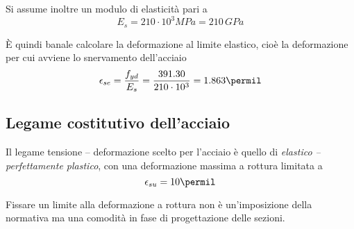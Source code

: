 Si assume inoltre un modulo di elasticit\`a pari a 
\begin{equation}
    \label{eq:Es}
	E_s = 210\cdot 10^3 MPa = 210\,GPa
\end{equation}

\`E quindi banale calcolare la deformazione al limite elastico, cio\`e la deformazione per cui avviene lo snervamento dell'acciaio
\begin{equation}
	\epsilon_{se} = \dfrac{f_{yd}}{E_s} = \dfrac{391.30}{210\cdot 10^3} = 1.863\permil
\end{equation}



\subsection{Legame costitutivo dell'acciaio}

Il legame tensione -- deformazione scelto per l'acciaio \`e quello di \emph{elastico -- perfettamente plastico}, con una deformazione massima a rottura limitata a 
\[
\epsilon_{su} = 10\permil
\]

Fissare un limite alla deformazione a rottura non \`e un'imposizione della normativa ma una comodit\`a in fase di progettazione delle sezioni.

\cleardoublepage
